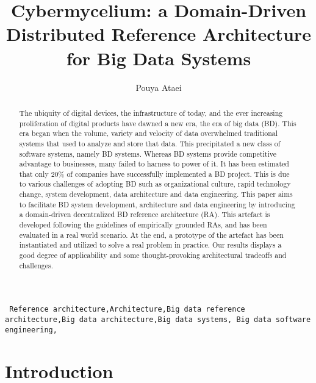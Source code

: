 \documentclass[review]{elsarticle}
\begin{document}
\begin{frontmatter}

\title{Cybermycelium: a Domain-Driven Distributed Reference Architecture for Big Data Systems}

\author{Pouya Ataei}

\address[mymainaddress]{School of Engineering, Computer and Mathematical Sciences, Auckland University of Technology, Auckland, New Zealand}


\begin{abstract}
The ubiquity of digital devices, the infrastructure of today, and the ever increasing proliferation of digital products have dawned a new era, the era of big data (BD). This era began when the volume, variety and velocity of data overwhelmed traditional systems that used to analyze and store that data. This precipitated a new class of software systems, namely BD systems. Whereas BD systems provide competitive advantage to businesses, many failed to harness to power of it. It has been estimated that only 20\% of companies have successfully implemented a BD project. This is due to various challenges of adopting BD such as organizational culture, rapid technology change, system development, data architecture and data engineering. This paper aims to facilitate BD system development, architecture and data engineering by introducing a domain-driven decentralized BD reference architecture (RA). This artefact is developed following the guidelines of empirically grounded RAs, and has been evaluated in a real world scenario. At the end, a prototype of the artefact has been instantiated and utilized to solve a real problem in practice. Our results displays a good degree of applicability and some thought-provoking architectural tradeoffs and challenges.
\end{abstract}

\begin{keyword}
\texttt{ Reference architecture\sep Architecture\sep Big data
reference architecture\sep Big data architecture\sep Big data systems\sep
Big data software engineering\sep}
\end{keyword}

\end{frontmatter}

\linenumbers


\section{Introduction}
\end{document}

